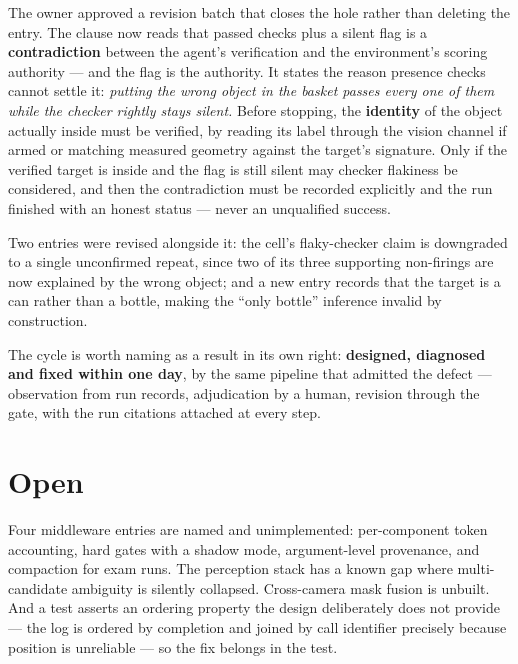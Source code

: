 \documentclass[11pt,a4paper]{report}
\begin{document}
\begin{resolved}[title={Fixed the same day, through the gate that produced it}]
The owner approved a revision batch that closes the hole rather than deleting
the entry. The clause now reads that passed checks plus a silent flag is a
\textbf{contradiction} between the agent's verification and the environment's
scoring authority --- and the flag is the authority. It states the reason
presence checks cannot settle it: \emph{putting the wrong object in the basket
passes every one of them while the checker rightly stays silent.} Before
stopping, the \textbf{identity} of the object actually inside must be verified,
by reading its label through the vision channel if armed or matching measured
geometry against the target's signature. Only if the verified target is inside
and the flag is still silent may checker flakiness be considered, and then the
contradiction must be recorded explicitly and the run finished with an honest
status --- never an unqualified success.

Two entries were revised alongside it: the cell's flaky-checker claim is
downgraded to a single unconfirmed repeat, since two of its three supporting
non-firings are now explained by the wrong object; and a new entry records that
the target is a can rather than a bottle, making the ``only bottle'' inference
invalid by construction.
\end{resolved}

\noindent
The cycle is worth naming as a result in its own right: \textbf{designed,
diagnosed and fixed within one day}, by the same pipeline that admitted the
defect --- observation from run records, adjudication by a human, revision
through the gate, with the run citations attached at every step.

\section{Open}

Four middleware entries are named and unimplemented: per-component token
accounting, hard gates with a shadow mode, argument-level provenance, and
compaction for exam runs. The perception stack has a known gap where
multi-candidate ambiguity is silently collapsed. Cross-camera mask fusion is
unbuilt. And a test asserts an ordering property the design deliberately does
not provide --- the log is ordered by completion and joined by call identifier
precisely because position is unreliable --- so the fix belongs in the test.
\end{document}
